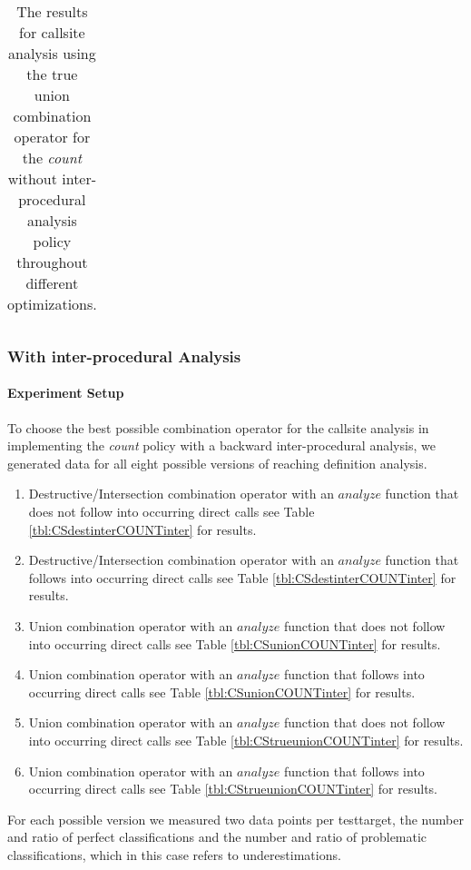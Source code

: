 \begin{table}[!htbp]
{\begin{tabular}{|c|c}
    	\end{tabular}
}
		\caption {The results for callsite analysis using the true union combination operator for the \textit{count} without inter-procedural analysis policy throughout different optimizations.}
		\label{tbl:CStrueunionCOUNTnointer}
\end{table}

\newpage

\subsubsection{With inter-procedural Analysis}

\paragraph{Experiment Setup}
To choose the best possible combination operator for the callsite analysis in implementing the \textit{count} policy with a backward inter-procedural analysis, we generated data for all eight possible versions of reaching definition analysis.
\begin{enumerate}
\item Destructive/Intersection combination operator with an $analyze$ function that does not follow into occurring direct calls see Table \ref{tbl:CSdestinterCOUNTinter} for results.
\item Destructive/Intersection combination operator with an $analyze$ function that follows into occurring direct calls see Table \ref{tbl:CSdestinterCOUNTinter} for results.
\item Union combination operator with an $analyze$ function that does not follow into occurring direct calls see Table \ref{tbl:CSunionCOUNTinter} for results.
\item Union combination operator with an $analyze$ function that follows into occurring direct calls see Table \ref{tbl:CSunionCOUNTinter} for results.
\item Union combination operator with an $analyze$ function that does not follow into occurring direct calls see Table \ref{tbl:CStrueunionCOUNTinter} for results.
\item Union combination operator with an $analyze$ function that follows into occurring direct calls see Table \ref{tbl:CStrueunionCOUNTinter} for results.
\end{enumerate}
For each possible version we measured two data points per testtarget, the number and ratio of perfect classifications and the number and ratio of problematic classifications, which in this case refers to underestimations.

